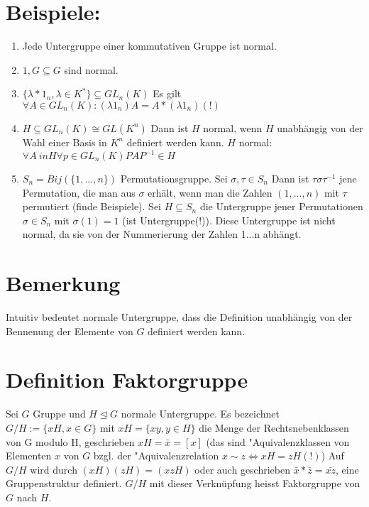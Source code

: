 \documentclass[12pt,a4paper,ngerman]{scrreprt}
\begin{document}
\section{Beispiele:}
\begin{enumerate}[(1)]
\item Jede Untergruppe einer kommutativen Gruppe ist normal.
\item $1,G \subseteq G$ sind normal.
\item $\{\lambda * 1_n, \lambda \in K^* \} \subseteq GL_n(K)$
Es gilt $\forall A \in GL_n(K) : (\lambda 1_n) A = A*(\lambda 1_n) (!)$
\item $H \subseteq GL_n(K) \cong GL(K^n)$ Dann ist $H$ normal, wenn $H$ unabhängig von der Wahl einer Basis in $K^n$ definiert werden kann.
$H$ normal: $\forall A \ in H \forall p \in GL_n(K) PAP^{-1} \in H$
\item $S_n = Bij(\{1, ... ,n\})$ Permutationsgruppe. Sei $\sigma, \tau \in S_n$ 
Dann ist $\tau \sigma \tau ^{-1}$ jene Permutation, die man aus $\sigma$ erhält, wenn man die Zahlen $(1, ... ,n)$ mit $\tau$ permutiert (finde Beispiele).
Sei $H \subseteq S_n$ die Untergruppe jener Permutationen $\sigma \in S_n$ mit $\sigma (1) = 1$ (ist Untergruppe(!)).
Diese Untergruppe ist nicht normal, da sie von der Nummerierung der Zahlen 1...n abhängt.
\end{enumerate}

\section{Bemerkung}
Intuitiv bedeutet normale Untergruppe, dass die Definition unabhängig von der Bennenung der Elemente von $G$ definiert werden kann.

\section{Definition Faktorgruppe}
Sei $G$ Gruppe und $H \trianglelefteq G$ normale Untergruppe. 
Es bezeichnet $G/H := \{xH, x\in G\}$ mit $xH=\{xy, y\in H\}$ die Menge der Rechtsnebenklassen von G modulo H, geschrieben $xH = \bar{x} = [x]$
(das sind "Aquivalenzklassen von Elementen $x$ von $G$ bzgl. der "Aquivalenzrelation $x \sim z \Leftrightarrow xH=zH (!)$)
Auf $G/H$ wird durch $(xH)(zH) = (xzH)$ oder auch geschrieben $\bar{x} *\bar{z} = \bar{xz}$, eine Gruppenstruktur definiert.
$G/H$ mit dieser Verknüpfung heisst Faktorgruppe von $G$ nach $H$.
\end{document}
